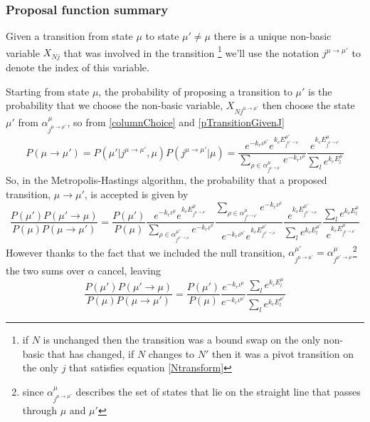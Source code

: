 \documentclass{article}
\begin{document}
\subsubsection{Proposal function summary}

Given a transition from state $\mu$ to state $\mu' \ne \mu$ there is a unique non-basic variable $X_{Nj}$ that was involved in the transition \footnote{if $N$ is unchanged then the transition was a bound swap on the only non-basic that has changed, if $N$ changes to $N'$ then it was a pivot transition on the only $j$ that satisfies equation \eqref{Ntransform}} we'll use the notation $j^{\mu\to\mu'}$ to denote the index of this variable.

Starting from state $\mu$, the probability of proposing a transition to $\mu'$ is the probability that we choose the non-basic variable, $X_{Nj^{\mu\to\mu'}}$ then choose the state $\mu'$ from $\alpha^\mu_{j^{\mu\to\mu'}}$, so from \eqref{columnChoice} and \eqref{pTransitionGivenJ}
\[
P(\mu \rightarrow \mu') 
= 
P(\mu'|j^{\mu\to\mu'},\mu)P(j^{\mu\to\mu'}|\mu) 
=
\frac{e^{-k_r \iota^{\mu'}} e^{k_cE^{\mu'}_{j^{\mu'\to\mu}}}}
	{\sum_{\rho \in \alpha^\mu_{j^{\mu\to\mu'}}}e^{-k_r\iota^\rho}}
\frac{e^{k_c E^\mu_{j^{\mu\to\mu'}}}}
	{\sum_l e^{k_c E^\mu_l}}
\]
So, in the Metropolis-Hastings algorithm, the probability that a proposed transition, $\mu\to\mu'$, is accepted is given by
\[
\frac{P(\mu')P(\mu'\to\mu)}{P(\mu)P(\mu\to\mu')} 
=
\frac{P(\mu')}
	{P(\mu)}
\frac{e^{-k_r \iota^{\mu}}e^{k_cE^{\mu}_{j^{\mu\to\mu'}}}}
	{\sum_{\rho \in \alpha^{\mu'}_{j^{\mu'\to\mu}}}e^{-k_r\iota^\rho}}
\frac{\sum_{\rho \in \alpha^{\mu}_{j^{\mu\to\mu'}}}e^{-k_r\iota^\rho}}
	{e^{-k_r \iota^{\mu'}}e^{k_cE^{\mu'}_{j^{\mu'\to\mu}}}}
\frac{e^{k_c E^{\mu'}_{j^{\mu'\to\mu}}}}
	{\sum_l e^{k_c E^{\mu'}_l}}
\frac{\sum_l e^{k_c E^\mu_l}}
	{e^{k_c E^\mu_{j^{\mu\to\mu'}}}}
\]
However thanks to the fact that we included the null transition,  $\alpha^{\mu'}_{j^{\mu\to\mu'}} = \alpha^\mu_{j^{\mu'\to\mu}}$\footnote{since $\alpha^\mu_{j^{\mu\to\mu'}}$ describes the set of states that lie on the straight line that passes through $\mu$ and $\mu'$} the two sums over $\alpha$ cancel, leaving
\begin{equation}
\frac{P(\mu')P(\mu'\to\mu)}
	{P(\mu)P(\mu\to\mu')} 
=
\frac{P(\mu')}
	{P(\mu)}
\frac{e^{-k_r \iota^{\mu}}}
	{e^{-k_r \iota^{\mu'}}}
\frac{\sum_l e^{k_c E^\mu_l}}
	{\sum_l e^{k_c E^{\mu'}_l}}
\label{acceptance1}
\end{equation}
\end{document}
